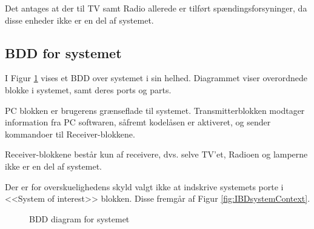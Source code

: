 Det antages at der til TV samt Radio allerede er tilført spændingsforsyninger, da disse enheder ikke er en del af systemet.

\clearpage

\subsection{BDD for systemet}

I Figur \ref{fig:BDDsystem} vises et BDD over systemet i sin helhed. Diagrammet viser overordnede blokke i systemet, samt deres ports og parts.

PC blokken er brugerens grænseflade til systemet. Transmitterblokken modtager information fra PC softwaren, såfremt kodelåsen er aktiveret, og sender kommandoer til Receiver-blokkene.

Receiver-blokkene består kun af receivere, dvs. selve TV'et, Radioen og lamperne ikke er en del af systemet.

Der er for overskuelighedens skyld valgt ikke at indskrive systemets porte i <<System of interest>> blokken. Disse fremgår af Figur \ref{fig:IBDsystemContext}.


\begin{figure}[h]
	\centering {}
	\caption{BDD diagram for systemet}
	\label{fig:BDDsystem}
\end{figure}

\clearpage

